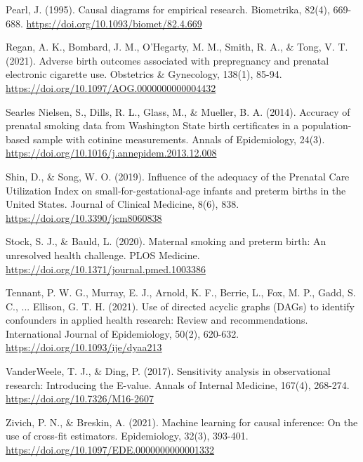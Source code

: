 {Pearl, J. (1995). Causal diagrams for empirical research. Biometrika, 82(4), 669-688. \url{https://doi.org/10.1093/biomet/82.4.669}

Regan, A. K., Bombard, J. M., O'Hegarty, M. M., Smith, R. A., \& Tong, V. T. (2021). Adverse birth outcomes associated with prepregnancy and prenatal electronic cigarette use. Obstetrics \& Gynecology, 138(1), 85-94. \url{https://doi.org/10.1097/AOG.0000000000004432}

Searles Nielsen, S., Dills, R. L., Glass, M., \& Mueller, B. A. (2014). Accuracy of prenatal smoking data from Washington State birth certificates in a population-based sample with cotinine measurements. Annals of Epidemiology, 24(3). \url{https://doi.org/10.1016/j.annepidem.2013.12.008}

Shin, D., \& Song, W. O. (2019). Influence of the adequacy of the Prenatal Care Utilization Index on small-for-gestational-age infants and preterm births in the United States. Journal of Clinical Medicine, 8(6), 838. \url{https://doi.org/10.3390/jcm8060838}

Stock, S. J., \& Bauld, L. (2020). Maternal smoking and preterm birth: An unresolved health challenge. PLOS Medicine. \url{https://doi.org/10.1371/journal.pmed.1003386}

Tennant, P. W. G., Murray, E. J., Arnold, K. F., Berrie, L., Fox, M. P., Gadd, S. C., ... Ellison, G. T. H. (2021). Use of directed acyclic graphs (DAGs) to identify confounders in applied health research: Review and recommendations. International Journal of Epidemiology, 50(2), 620-632. \url{https://doi.org/10.1093/ije/dyaa213}

VanderWeele, T. J., \& Ding, P. (2017). Sensitivity analysis in observational research: Introducing the E-value. Annals of Internal Medicine, 167(4), 268-274. \url{https://doi.org/10.7326/M16-2607}

Zivich, P. N., \& Breskin, A. (2021). Machine learning for causal inference: On the use of cross-fit estimators. Epidemiology, 32(3), 393-401. \url{https://doi.org/10.1097/EDE.0000000000001332}
}
